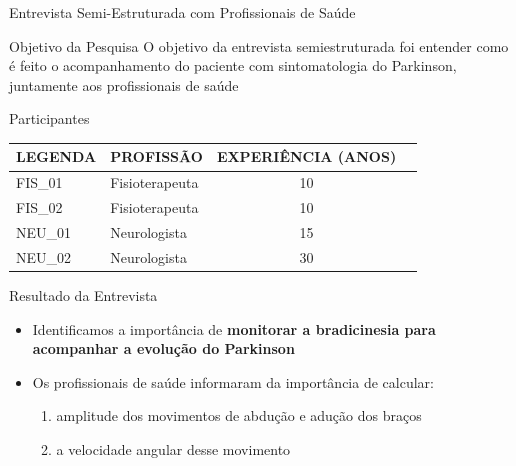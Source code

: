 \documentclass{beamer}
\begin{document}
\begin{frame}{Entrevista Semi-Estruturada com Profissionais de Saúde} 
    \begin{block}{Objetivo da Pesquisa}
    O objetivo da entrevista semiestruturada foi entender como é feito o acompanhamento do paciente com sintomatologia do Parkinson, juntamente aos profissionais de saúde
    \end{block}
		\begin{block}{Participantes}
			\begin{table}[h]
			\begin{tabular}{|l|l|c|c|}
			\hline
			\textbf{LEGENDA} & \textbf{PROFISSÃO}             & \multicolumn{1}{|l|}{\textbf{EXPERIÊNCIA (ANOS)}} \\ \hline
			FIS\_01          & Fisioterapeuta & 10                                                \\ \hline
			FIS\_02          & Fisioterapeuta    & 10                                                \\ \hline
			NEU\_01          & Neurologista            & 15                                                \\ \hline
			NEU\_02          & Neurologista            & 30                                                \\ \hline
			\end{tabular}
			\end{table}
    \end{block}
\end{frame} 

\begin{frame}{Resultado da Entrevista} 
    \begin{block}{}
			\begin{itemize}
				\item Identificamos a importância de \textbf{monitorar a bradicinesia para acompanhar a evolução do Parkinson}
				\item Os profissionais de saúde informaram da importância de calcular:
					\begin{enumerate}
						\item amplitude dos movimentos de abdução e adução dos braços
						\item a velocidade angular desse movimento
					\end{enumerate}
			\end{itemize}
    \end{block}
\end{frame} 
\end{document}

